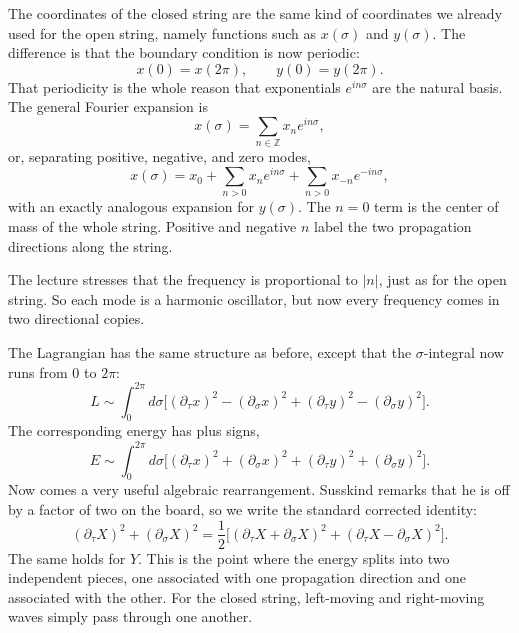 The coordinates of the closed string are the same kind of coordinates we already used for the open string, namely functions such as \(x(\sigma)\) and \(y(\sigma)\). The difference is that the boundary condition is now periodic:
\begin{equation}
x(0)=x(2\pi),
\qquad
y(0)=y(2\pi).
\end{equation}
That periodicity is the whole reason that exponentials \(e^{in\sigma}\) are the natural basis. The general Fourier expansion is
\begin{equation}
x(\sigma)=\sum_{n\in\mathbb Z} x_n e^{in\sigma},
\end{equation}
or, separating positive, negative, and zero modes,
\begin{equation}
x(\sigma)=x_0+\sum_{n>0}x_n e^{in\sigma}+\sum_{n>0}x_{-n}e^{-in\sigma},
\end{equation}
with an exactly analogous expansion for \(y(\sigma)\). The \(n=0\) term is the center of mass of the whole string. Positive and negative \(n\) label the two propagation directions along the string.

The lecture stresses that the frequency is proportional to \(|n|\), just as for the open string. So each mode is a harmonic oscillator, but now every frequency comes in two directional copies.

The Lagrangian has the same structure as before, except that the \(\sigma\)-integral now runs from \(0\) to \(2\pi\):
\begin{equation}
L \sim \int_0^{2\pi} d\sigma
\Big[
(\partial_\tau x)^2-(\partial_\sigma x)^2
+
(\partial_\tau y)^2-(\partial_\sigma y)^2
\Big].
\end{equation}
The corresponding energy has plus signs,
\begin{equation}
E \sim \int_0^{2\pi} d\sigma
\Big[
(\partial_\tau x)^2+(\partial_\sigma x)^2
+
(\partial_\tau y)^2+(\partial_\sigma y)^2
\Big].
\end{equation}
Now comes a very useful algebraic rearrangement. Susskind remarks that he is off by a factor of two on the board, so we write the standard corrected identity:
\begin{equation}
(\partial_\tau X)^2+(\partial_\sigma X)^2
=
\frac12\Big[
(\partial_\tau X+\partial_\sigma X)^2
+
(\partial_\tau X-\partial_\sigma X)^2
\Big].
\end{equation}
The same holds for \(Y\). This is the point where the energy splits into two independent pieces, one associated with one propagation direction and one associated with the other. For the closed string, left-moving and right-moving waves simply pass through one another.

